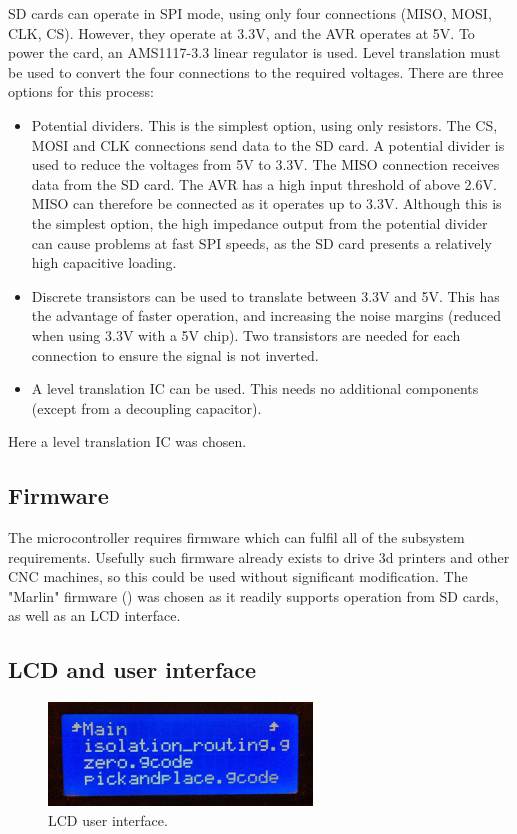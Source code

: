 SD cards can operate in SPI mode, using only four connections (MISO, MOSI, CLK, CS). However, they operate at 3.3V, and the AVR operates at 5V. To power the card, an AMS1117-3.3 linear regulator
is used. Level translation must be used to convert the four connections to the required voltages. There are three options for this process:

\begin{itemize} \itemsep0em
	\item	Potential dividers. This is the simplest option, using only resistors. The CS, MOSI and CLK connections send data to the SD card. A potential divider is used to reduce the voltages
			from 5V to 3.3V. The MISO connection receives data from the SD card. The AVR has a high input threshold of above 2.6V. MISO can therefore be connected as it operates up to 3.3V. 
			Although this is the simplest option, the high impedance output from the potential divider can cause problems at fast SPI speeds, as the SD card presents a relatively high
			capacitive loading.
	\item	Discrete transistors can be used to translate between 3.3V and 5V. This has the advantage of faster operation, and increasing the noise margins (reduced when using 3.3V with a 5V chip).
			Two transistors are needed for each connection to ensure the signal is not inverted.
	\item	A level translation IC can be used. This needs no additional components (except from a decoupling capacitor).
\end{itemize}
Here a level translation IC was chosen.


\subsection{Firmware}
\label{firmwarestuff}
The microcontroller requires firmware which can fulfil all of the subsystem
requirements. Usefully such firmware already exists to drive 3d printers
and other CNC machines, so this could be used without significant
modification. The "Marlin" firmware (\cite{marlin}) was chosen as it readily supports
operation from SD cards, as well as an LCD interface.

\subsection{LCD and user interface}
\label{lcdUI}

\begin{figure}[ht!]
\centering
\includegraphics[width=70mm]{resources/lcd_real.jpg}
\caption{LCD user interface.}
\label{lcdreal}
\end{figure}

